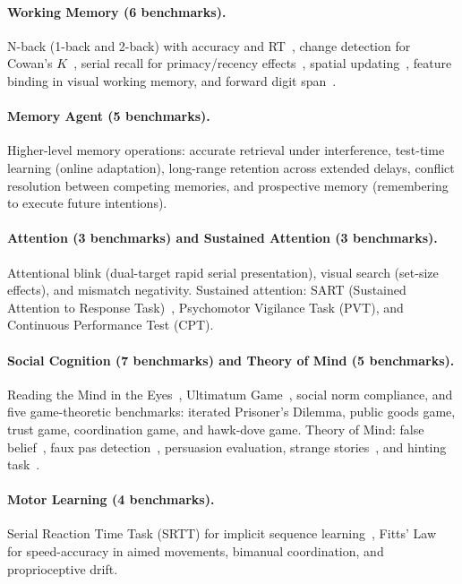 \documentclass[11pt,letterpaper]{article}
\begin{document}
\paragraph{Working Memory (6 benchmarks).} N-back (1-back and 2-back) with accuracy and RT~\citep{jaeggi2010relationship,owen2005nback}, change detection for Cowan's $K$~\citep{luck1997capacity,cowan2001magical}, serial recall for primacy/recency effects~\citep{murdock1962serial}, spatial updating~\citep{oberauer2003selective}, feature binding in visual working memory, and forward digit span~\citep{wechsler2008wais}.

\paragraph{Memory Agent (5 benchmarks).} Higher-level memory operations: accurate retrieval under interference, test-time learning (online adaptation), long-range retention across extended delays, conflict resolution between competing memories, and prospective memory (remembering to execute future intentions).

\paragraph{Attention (3 benchmarks) and Sustained Attention (3 benchmarks).} Attentional blink (dual-target rapid serial presentation), visual search (set-size effects), and mismatch negativity. Sustained attention: SART (Sustained Attention to Response Task)~\citep{robertson1997sustained}, Psychomotor Vigilance Task (PVT), and Continuous Performance Test (CPT).

\paragraph{Social Cognition (7 benchmarks) and Theory of Mind (5 benchmarks).} Reading the Mind in the Eyes~\citep{baroncohen2001eyes}, Ultimatum Game~\citep{guth1982experimental}, social norm compliance, and five game-theoretic benchmarks: iterated Prisoner's Dilemma, public goods game, trust game, coordination game, and hawk-dove game. Theory of Mind: false belief~\citep{baroncohen1985mindblindness}, faux pas detection~\citep{stone1998faux}, persuasion evaluation, strange stories~\citep{happe1994advanced}, and hinting task~\citep{corcoran1995schizophrenia}.

\paragraph{Motor Learning (4 benchmarks).} Serial Reaction Time Task (SRTT) for implicit sequence learning~\citep{nissen1987attentional}, Fitts' Law~\citep{fitts1954information} for speed-accuracy in aimed movements, bimanual coordination, and proprioceptive drift.
\end{document}
